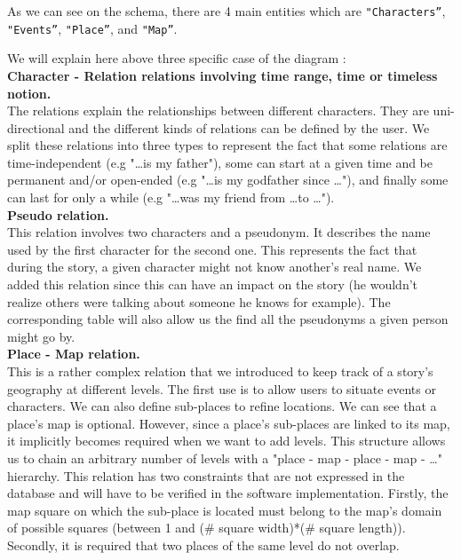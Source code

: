 \documentclass[a4paper ,12pt,french]{article}
\begin{document}
As we can see on the schema, there are 4 main entities which are \texttt{"Characters''}, \texttt{"Events''}, \texttt{"Place''}, and \texttt{"Map''}.


We will explain here above three specific case of the diagram :\\

\textbf{Character - Relation relations involving time range, time or timeless notion.} \\
The relations explain the relationships between different characters. They are uni-directional and the different kinds of relations can be defined by the user.
We split these relations into three types to represent the fact that some relations are time-independent (e.g "\dots is my father"), some can start at a given time and be permanent and/or open-ended (e.g "\dots is my godfather since \dots"), and finally some can last for only a while (e.g "\dots was my friend from \dots to \dots").\\

\textbf{Pseudo relation.} \\
This relation involves two characters and a pseudonym. It describes the name used by the first character for the second one. This represents the fact that during the story, a given character might not know another's real name. We added this relation since this can have an impact on the story (he wouldn't realize others were talking about someone he knows for example).
The corresponding table will also allow us the find all the pseudonyms a given person might go by.\\

\textbf{Place - Map relation.} \\
This is a rather complex relation that we introduced to keep track of a story's geography at different levels. The first use is to allow users to situate events or characters. We can also define sub-places to refine locations. 
We can see that a place's map is optional. However, since a place's sub-places are linked to its map, it implicitly  becomes required when we want to add levels. This structure allows us to chain an arbitrary number of levels with a "place - map - place - map - \dots" hierarchy.
This relation has two constraints that are not expressed in the database and will have to be verified in the software implementation. Firstly, the map square on which the sub-place is located must belong to the map's domain of possible squares (between 1 and (\# square width)*(\# square length)). Secondly, it is required that two places of the same level do not overlap.
\end{document}

